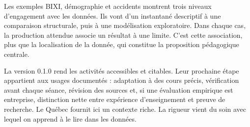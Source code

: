 Les exemples BIXI, démographie et accidents montrent trois niveaux d'engagement avec les données. Ils vont d'un instantané descriptif à une comparaison structurale, puis à une modélisation exploratoire. Dans chaque cas, la production attendue associe un résultat à une limite. C'est cette association, plus que la localisation de la donnée, qui constitue la proposition pédagogique centrale.

La version 0.1.0 rend les activités accessibles et citables. Leur prochaine étape appartient aux usages documentés : adaptation à des cours précis, vérification avant chaque séance, révision des sources et, si une évaluation empirique est entreprise, distinction nette entre expérience d'enseignement et preuve de recherche. Le Québec fournit ici un contexte riche. La rigueur vient du soin avec lequel on apprend à le lire dans les données.

